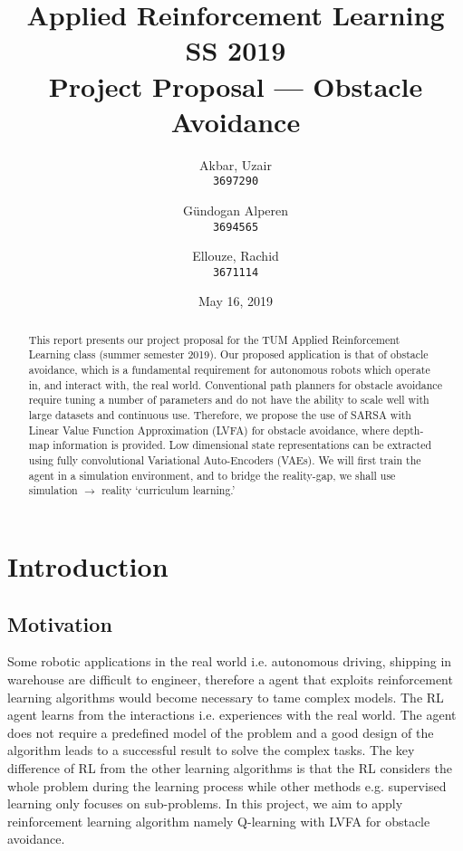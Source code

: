 \documentclass{article}
\title{Applied Reinforcement Learning\\
        \vspace{-0.20cm}
        {\large SS 2019}\\
        \vspace{0.20cm}
        {Project Proposal --- Obstacle Avoidance}}
\author{
  \small Akbar, Uzair\\
  \small \texttt{3697290}
  \and
  \small G\"undogan Alperen\\
  \small \texttt{3694565}
  \and
  \small Ellouze, Rachid \\
  \small \texttt{3671114}
}
\date{May 16, 2019}
\begin{document}
\begin{titlingpage}
    \maketitle
    \begin{abstract}
        This report presents our project proposal for the TUM Applied Reinforcement Learning class (summer semester 2019). Our proposed application is that of obstacle avoidance, which is a fundamental requirement for autonomous robots which operate in, and interact with, the real world. Conventional path planners for obstacle avoidance require tuning a number of parameters and do not have the ability to scale well with large datasets and continuous use. Therefore, we propose the use of SARSA with Linear Value Function Approximation (LVFA) for obstacle avoidance, where depth-map information is provided. Low dimensional state representations can be extracted using fully convolutional Variational Auto-Encoders (VAEs). We will first train the agent in a simulation environment, and to bridge the reality-gap, we shall use simulation $\rightarrow$ reality `curriculum learning.'
    \end{abstract}
    \tableofcontents
\end{titlingpage}


\section{Introduction}
\subsection{Motivation}
Some robotic applications in the real world i.e. autonomous driving, shipping in warehouse are difficult to engineer, therefore a agent that exploits reinforcement learning algorithms would become necessary to tame complex models. The RL agent learns from the interactions i.e. experiences with the real world. The agent does not require a predefined model of the problem and a good design of the algorithm leads to a successful result to solve the complex tasks. The key difference of RL from the other learning algorithms is that the RL considers the whole problem during the learning process while other methods e.g. supervised learning only focuses on sub-problems. In this project, we aim to apply  reinforcement learning algorithm namely Q-learning with LVFA for obstacle avoidance.
\end{document}
